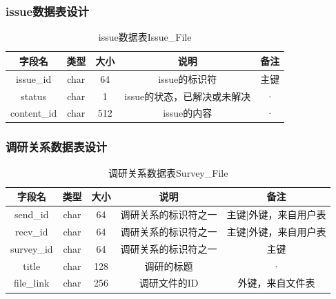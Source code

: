 {\color{red}
\subsubsection{issue数据表设计}
\begin{table}[htbp]
\centering
\caption{\color{red} issue数据表Issue\_File} \label{tab:order-database}
{\color{red}
\begin{tabular}{|c|c|c|c|c|}
    \hline
    字段名 & 类型 & 大小 & 说明 & 备注 \\
    \hline
    issue\_id & char & 64 & issue的标识符 & 主键 \\
    \hline
    status & char & 1 & issue的状态，已解决或未解决 & · \\
    \hline
    content\_id & char & 512 & issue的内容 & ·\\
    \hline
\end{tabular}
}
\end{table}

\subsubsection{调研关系数据表设计}
\begin{table}[htbp]
\centering
{\color{red}
\caption{\color{red}调研关系数据表Survey\_File} \label{tab:order-database}

\begin{tabular}{|c|c|c|c|c|}
    \hline
    字段名 & 类型 & 大小 & 说明 & 备注 \\
    \hline
    send\_id & char & 64 & 调研关系的标识符之一 & 主键|外键，来自用户表 \\
    \hline
    recv\_id & char & 64 & 调研关系的标识符之一 & 主键|外键，来自用户表 \\
    \hline
    survey\_id & char & 64 & 调研关系的标识符之一 & 主键 \\
    \hline
    title & char & 128 & 调研的标题 & · \\ 
    \hline
    file\_link & char & 256 & 调研文件的ID & 外键，来自文件表 \\
    \hline
\end{tabular}
}
\end{table}
\newpage
}
